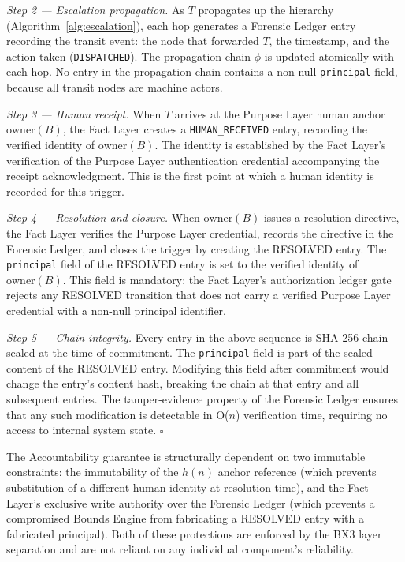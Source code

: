 \documentclass[12pt]{article}
\begin{document}
\medskip

\noindent\textit{Step 2 — Escalation propagation.} As $T$ propagates up the hierarchy (Algorithm~\ref{alg:escalation}), each hop generates a Forensic Ledger entry recording the transit event: the node that forwarded $T$, the timestamp, and the action taken (\texttt{DISPATCHED}). The propagation chain $\phi$ is updated atomically with each hop. No entry in the propagation chain contains a non-null \texttt{principal} field, because all transit nodes are machine actors.

\medskip

\noindent\textit{Step 3 — Human receipt.} When $T$ arrives at the Purpose Layer human anchor $\text{owner}(B)$, the Fact Layer creates a \texttt{HUMAN\_RECEIVED} entry, recording the verified identity of $\text{owner}(B)$. The identity is established by the Fact Layer's verification of the Purpose Layer authentication credential accompanying the receipt acknowledgment. This is the first point at which a human identity is recorded for this trigger.

\medskip

\noindent\textit{Step 4 — Resolution and closure.} When $\text{owner}(B)$ issues a resolution directive, the Fact Layer verifies the Purpose Layer credential, records the directive in the Forensic Ledger, and closes the trigger by creating the RESOLVED entry. The \texttt{principal} field of the RESOLVED entry is set to the verified identity of $\text{owner}(B)$. This field is mandatory: the Fact Layer's authorization ledger gate rejects any RESOLVED transition that does not carry a verified Purpose Layer credential with a non-null principal identifier.

\medskip

\noindent\textit{Step 5 — Chain integrity.} Every entry in the above sequence is SHA-256 chain-sealed at the time of commitment. The \texttt{principal} field is part of the sealed content of the RESOLVED entry. Modifying this field after commitment would change the entry's content hash, breaking the chain at that entry and all subsequent entries. The tamper-evidence property of the Forensic Ledger ensures that any such modification is detectable in O($n$) verification time, requiring no access to internal system state. $\square$

\bigskip

The Accountability guarantee is structurally dependent on two immutable constraints: the immutability of the $h(n)$ anchor reference (which prevents substitution of a different human identity at resolution time), and the Fact Layer's exclusive write authority over the Forensic Ledger (which prevents a compromised Bounds Engine from fabricating a RESOLVED entry with a fabricated principal). Both of these protections are enforced by the BX3 layer separation and are not reliant on any individual component's reliability.
\end{document}
